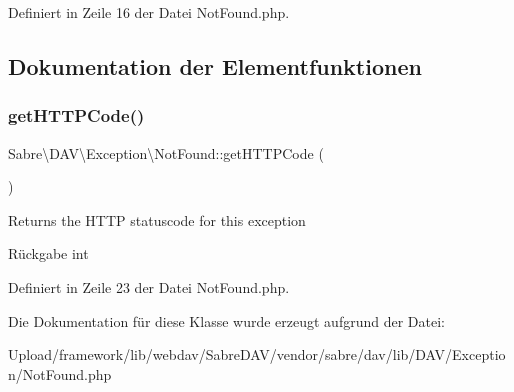 Definiert in Zeile 16 der Datei Not\+Found.\+php.



\subsection{Dokumentation der Elementfunktionen}
\mbox{\label{class_sabre_1_1_d_a_v_1_1_exception_1_1_not_found_add9571541b5568437b300275c5ec2ea4}} 
\subsubsection{\texorpdfstring{get\+H\+T\+T\+P\+Code()}{getHTTPCode()}}
{\footnotesize\ttfamily Sabre\textbackslash{}\+D\+A\+V\textbackslash{}\+Exception\textbackslash{}\+Not\+Found\+::get\+H\+T\+T\+P\+Code (\begin{DoxyParamCaption}{ }\end{DoxyParamCaption})}

Returns the H\+T\+TP statuscode for this exception

\begin{DoxyReturn}{Rückgabe}
int 
\end{DoxyReturn}


Definiert in Zeile 23 der Datei Not\+Found.\+php.



Die Dokumentation für diese Klasse wurde erzeugt aufgrund der Datei\+:\begin{DoxyCompactItemize}
\item 
Upload/framework/lib/webdav/\+Sabre\+D\+A\+V/vendor/sabre/dav/lib/\+D\+A\+V/\+Exception/Not\+Found.\+php\end{DoxyCompactItemize}
